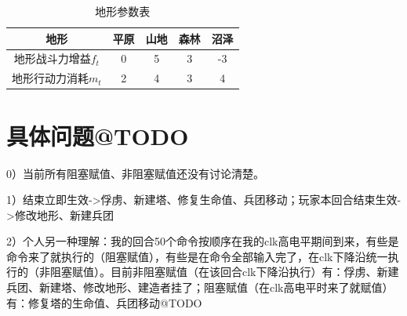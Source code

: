 \documentclass[a4paper,4pt]{article}
\begin{document}
\begin{table}[htbp]
	\centering
	\caption{地形参数表}
	\begin{tabular}{c|c|c|c|c}
		\hline
		地形                & 平原 & 山地 & 森林 & 沼泽 \bigstrut \\
		\hline
		地形战斗力增益$f_t$ & 0    & 5    & 3    & -3 \bigstrut   \\
		\hline
		地形行动力消耗$m_t$ & 2    & 4    & 3    & 4 \bigstrut    \\
		\hline
	\end{tabular}%
	\label{地形}%
\end{table}%
\section{具体问题@TODO}
0）当前所有阻塞赋值、非阻塞赋值还没有讨论清楚。\par
1）结束立即生效->俘虏、新建塔、修复生命值、兵团移动；玩家本回合结束生效->修改地形、新建兵团\par
2）个人另一种理解：我的回合50个命令按顺序在我的clk高电平期间到来，有些是命令来了就执行的（阻塞赋值），有些是在命令全部输入完了，在clk下降沿统一执行的（非阻塞赋值）。目前非阻塞赋值（在该回合clk下降沿执行）有：俘虏、新建兵团、新建塔、修改地形、建造者挂了；阻塞赋值（在clk高电平时来了就赋值）有：修复塔的生命值、兵团移动@TODO
\end{document}
